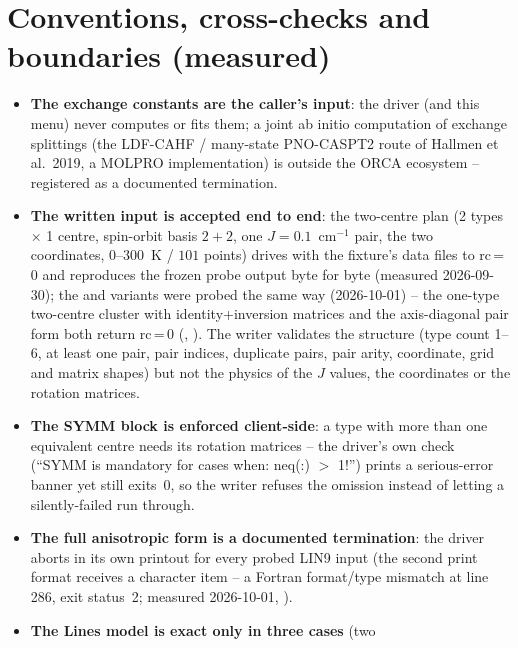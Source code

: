 \section{Conventions, cross-checks and boundaries (measured)}

\begin{readbox}
\begin{itemize}
  \item \textbf{The exchange constants are the caller's input}: the driver
    (and this menu) never computes or fits them; a joint ab initio
    computation of exchange splittings (the LDF-CAHF / many-state
    PNO-CASPT2 route of Hallmen et al.\ 2019, a MOLPRO implementation) is
    outside the ORCA ecosystem -- registered as a documented termination.
  \item \textbf{The written input is accepted end to end}: the two-centre
    plan (2 types $\times$ 1 centre, spin-orbit basis $2+2$, one
    $J=0.1$~cm$^{-1}$ pair, the two coordinates, 
    $0$--$300$~K / $101$ points) drives  with the
    fixture's data files to rc\,=\,0 and reproduces the frozen probe output
    byte for byte (measured 2026-09-30); the  and 
    variants were probed the same way (2026-10-01) -- the one-type
    two-centre cluster with identity+inversion matrices and the
    axis-diagonal pair form both return rc\,=\,0 (,
    ).  The writer validates the structure (type
    count 1--6, at least one pair, pair indices, duplicate pairs, pair
    arity, coordinate, grid and matrix shapes) but not the physics of the
    $J$ values, the coordinates or the rotation matrices.
  \item \textbf{The SYMM block is enforced client-side}: a type with more
    than one equivalent centre needs its rotation matrices -- the driver's
    own check (``SYMM is mandatory for cases when: neq(:) $>$ 1!'') prints
    a serious-error banner yet still exits~0, so the writer refuses the
    omission instead of letting a silently-failed run through.
  \item \textbf{The full anisotropic  form is a documented
    termination}: the driver aborts in its own printout for every probed
    LIN9 input (the second print format  receives a
    character item -- a Fortran format/type mismatch at
     line 286, exit status~2; measured
    2026-10-01, ).
  \item \textbf{The Lines model is exact only in three cases} (two

\end{itemize}
\end{readbox}
